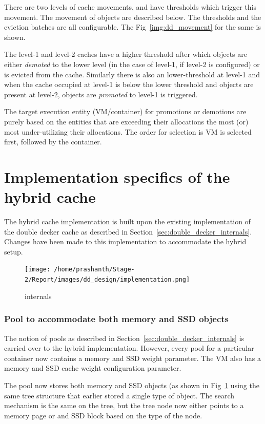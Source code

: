 	There are two levels of cache movements, and have thresholds which trigger this movement. The movement of
	objects are described below. The thresholds and the eviction batches are all configurable. The Fig~\ref{img:dd_movement}
	for the same is shown.
	
	The level-1 and level-2 caches have a higher threshold after which objects are either \textit{demoted} to the 
	lower level (in the case of level-1, if level-2 is configured) or is evicted from the cache. Similarly
	there is also an lower-threshold at level-1 and when the cache occupied at level-1 is below the lower threshold
	and objects are present at level-2, objects are \textit{promoted} to level-1 is triggered.
	
	The target execution entity (VM/container) for promotions or demotions are purely based on the entities that
	are exceeding their allocations the most (or) most under-utilizing their allocations. The order for selection
	is VM is selected first, followed by the container.
      
	
  \section{Implementation specifics of the hybrid cache}

    The hybrid cache implementation is built upon the existing implementation of the double decker cache as described in 
    Section~\ref{sec:double_decker_internals}. Changes have been made to this implementation to accommodate the hybrid setup.
    
    \begin{figure}
      \centering
      \texttt{[image: /home/prashanth/Stage-2/Report/images/dd\_design/implementation.png]}
      \caption{\dd{} internals}
      \label{img:dd_internals}
    \end{figure}
  
      \subsubsection{Pool to accommodate both memory and SSD objects}
	The notion of pools as described in Section~\ref{sec:double_decker_internals} is carried over to the hybrid implementation.
	However, every pool for a particular container now contains a memory and SSD weight parameter. The VM also has a memory
	and SSD cache weight configuration parameter.
	
	The pool now stores both memory and SSD objects (as shown in Fig~\ref{img:dd_internals} using the same tree structure 
	that earlier stored a single type of object. The search mechanism is the same on the tree, but the tree node now either 
	points to a memory page or and SSD block based on the type of the node.  
	
